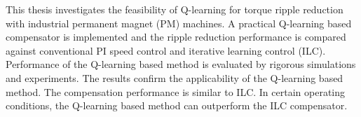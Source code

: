 \documentclass[english, 12pt, a4paper, elec, utf8, a-2b, online]{aaltothesis}
\date{25.6.2020} %
\begin{document}
\makecoverpage

\makecopyrightpage






\begin{abstractpage}[english]
This thesis investigates the feasibility of Q-learning for torque ripple reduction with industrial permanent magnet (PM) machines. A practical Q-learning based compensator is implemented and the ripple reduction performance is compared against conventional PI speed control and iterative learning control (ILC). Performance of the Q-learning based method is evaluated by rigorous simulations and experiments. The results confirm the applicability of the Q-learning based method. The compensation performance is similar to ILC. In certain operating conditions, the Q-learning based method can outperform the ILC compensator.
\end{abstractpage}

\end{document}
